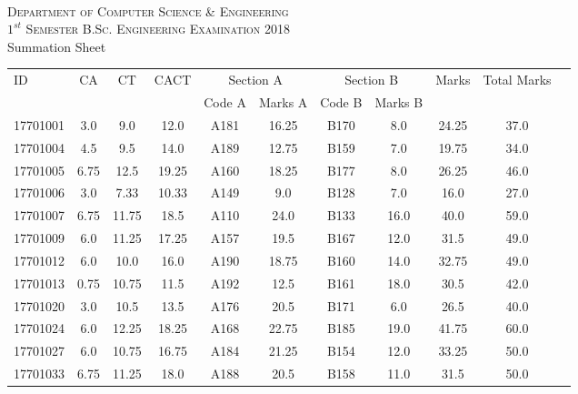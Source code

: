 \documentclass[12pt]{article}
\begin{document}
    \centering
    \begin{minipage}[m]{.8\textwidth} \centering 
	\smallskip
	\\
	\textsc{Department of Computer Science \& Engineering}\\
	\textsc{$1^{st}$ Semester B.Sc. Engineering Examination 2018}\\
	{\large {\sc Summation Sheet}}\\  
    \end{minipage} 
    \begin{center} 
	\renewcommand{\arraystretch}{1.08}
	\begin{small}
    \begin{tabular}{|l|c|c|c|c|c|c|c|c|c|c|} \hline
	\multirow{2}{*}{ID} & 	\multirow{2}{*}{CA}  & 	\multirow{2}{*}{CT}  & 	\multirow{2}{*}{CACT}  & \multicolumn{2 }{|c|}{Section A}& \multicolumn{2 }{c|}{Section B} & 	\multirow{2}{*}{Marks}  & 	\multirow{2}{*}{Total Marks}  \\ 
	&  &  &  & Code A & Marks A & Code B & Marks B&  &  \\ \hline
17701001 & 3.0 & 9.0 & 12.0 & A181 & 16.25 & B170 & 8.0 & 24.25 & 37.0\\ \hline 
17701004 & 4.5 & 9.5 & 14.0 & A189 & 12.75 & B159 & 7.0 & 19.75 & 34.0\\ \hline 
17701005 & 6.75 & 12.5 & 19.25 & A160 & 18.25 & B177 & 8.0 & 26.25 & 46.0\\ \hline 
17701006 & 3.0 & 7.33 & 10.33 & A149 & 9.0 & B128 & 7.0 & 16.0 & 27.0\\ \hline 
17701007 & 6.75 & 11.75 & 18.5 & A110 & 24.0 & B133 & 16.0 & 40.0 & 59.0\\ \hline 
17701009 & 6.0 & 11.25 & 17.25 & A157 & 19.5 & B167 & 12.0 & 31.5 & 49.0\\ \hline 
17701012 & 6.0 & 10.0 & 16.0 & A190 & 18.75 & B160 & 14.0 & 32.75 & 49.0\\ \hline 
17701013 & 0.75 & 10.75 & 11.5 & A192 & 12.5 & B161 & 18.0 & 30.5 & 42.0\\ \hline 
17701020 & 3.0 & 10.5 & 13.5 & A176 & 20.5 & B171 & 6.0 & 26.5 & 40.0\\ \hline 
17701024 & 6.0 & 12.25 & 18.25 & A168 & 22.75 & B185 & 19.0 & 41.75 & 60.0\\ \hline 
17701027 & 6.0 & 10.75 & 16.75 & A184 & 21.25 & B154 & 12.0 & 33.25 & 50.0\\ \hline 
17701033 & 6.75 & 11.25 & 18.0 & A188 & 20.5 & B158 & 11.0 & 31.5 & 50.0\\ \hline 

\end{tabular}
\end{small}
\end{center}
\end{document}
